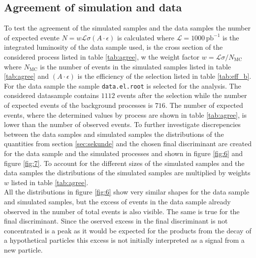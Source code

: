 \subsection{Agreement of simulation and data}
To test the agreement of the simulated samples and the data samples the number of expected evente $N = w \mathcal{L} \sigma (A \cdot \epsilon)$ is calculated 
where $\mathcal{L} = 1000 \, \si{\pico\barn\tothe{-1}}$ is the integrated luminosity of the data sample used, \sigma is the cross section of the considered 
process listed in table \ref{tab:agree}, w the weight factor $w = \mathcal{L} \sigma / N_\text{MC}$ where $N_\text{MC}$ is the number of events in the 
simulated samples listed in table \ref{tab:agree} and $(A \cdot \epsilon)$ is the efficiency of the selection listed in table \ref{tab:eff_b}.
For the data sample the sample \texttt{data.el.root} is selected for the analysis.
The considered datasample contains $1112$ events after the selection while the number of expected events of the background processes is $716$. 
The number of expected events, where the determined values by process are shown in table \ref{tab:agree}, is lower than the number of observed events. 
To further investigate discrepencies between the data samples and simulated samples the distributions of the quantities from section \ref{sec:sekunde} and the 
chosen final discriminant are created for the data sample and the simulated processes and shown in figure \ref{fig:6} and figure \ref{fig:7}.
To account for the different sizes of the simulated samples and the data samples the distributions of the simulated samples are multiplied by weights $w$ 
listed in table \ref{tab:agree}.\\
All the distributions in figure \ref{fig:6} show very similar shapes for the data sample and simulated samples, but the excess of events in the 
data sample already observed in the number of total events is also visible. The same is true for the final discriminant. 
Since the oserved excess in the final discriminant is not concentrated is a peak as it would be expected for the products from the 
decay of a hypothetical particles this excess is not initially interpreted as a signal from a new particle. 



